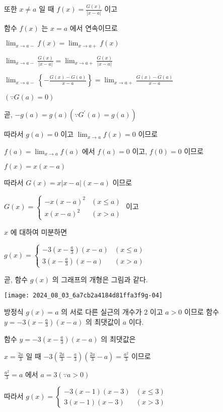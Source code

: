 \documentclass[10pt]{article}
\begin{document}
또한 \(x \neq a\) 일 때 \(f(x)=\frac{G(x)}{|x-a|}\) 이고

함수 \(f(x)\) 는 \(x=a\) 에서 연속이므로

\(\lim _{x \rightarrow a-} f(x)=\lim _{x \rightarrow a+} f(x)\)

\(\lim _{x \rightarrow a-} \frac{G(x)}{|x-a|}=\lim _{x \rightarrow a+} \frac{G(x)}{|x-a|}\)

\(\lim _{x \rightarrow a-}\left\{-\frac{G(x)-G(a)}{x-a}\right\}=\lim _{x \rightarrow a+} \frac{G(x)-G(a)}{x-a}\)

\((\because G(a)=0)\)

곧, \(-g(a)=g(a)\left(\because G^{\prime}(a)=g(a)\right)\)

따라서 \(g(a)=0\) 이고 \(\lim _{x \rightarrow a} f(x)=0\) 이므로

\(f(a)=\lim _{x \rightarrow a} f(a)\) 에서 \(f(a)=0\) 이고, \(f(0)=0\) 이므로

\(f(x)=x(x-a)\)

따라서 \(G(x)=x|x-a|(x-a)\) 이므로

\(G(x)=\left\{\begin{array}{ll}-x(x-a)^{2} & (x \leq a) \\ x(x-a)^{2} & (x>a)\end{array}\right.\) 이고

\(x\) 에 대하여 미분하면

\(g(x)= \begin{cases}-3\left(x-\frac{a}{3}\right)(x-a) & (x \leq a) \\ 3\left(x-\frac{a}{3}\right)(x-a) & (x>a)\end{cases}\)

곧, 함수 \(g(x)\) 의 그래프의 개형은 그림과 같다.

\begin{center}
\texttt{[image: 2024\_08\_03\_6a7cb2a4184d81ffa3f9g-04]}
\end{center}

방정식 \(g(x)=a\) 의 서로 다른 실근의 개수가 2 이고 \(a>0\) 이므로 함수 \(y=-3\left(x-\frac{a}{3}\right)(x-a)\) 의 최댓값이 \(a\) 이다.

함수 \(y=-3\left(x-\frac{a}{3}\right)(x-a)\) 의 최댓값은

\(x=\frac{2 a}{3}\) 일 때 \(-3\left(\frac{2 a}{3}-\frac{a}{3}\right)\left(\frac{2 a}{3}-a\right)=\frac{a^{2}}{3}\) 이므로

\(\frac{a^{2}}{3}=a\) 에서 \(a=3(\because a>0)\)

따라서 \(g(x)= \begin{cases}-3(x-1)(x-3) & (x \leq 3) \\ 3(x-1)(x-3) & (x>3)\end{cases}\)
\end{document}
